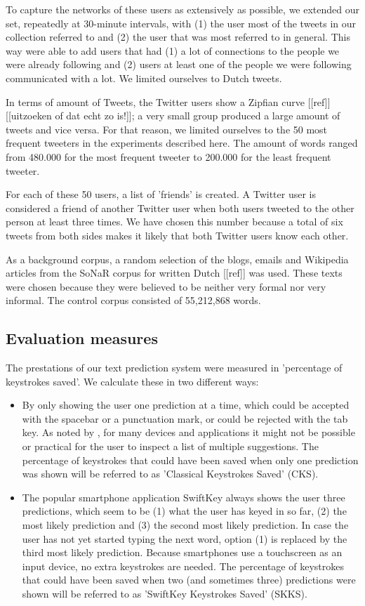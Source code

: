 \documentclass[11pt]{article}
\begin{document}
To capture the networks of these users as extensively as possible, we extended our set, repeatedly at 30-minute intervals, with (1) the user most of the tweets in our collection referred to and (2) the user that was most referred to in general. This way were able to add users that had (1) a lot of connections to the people we were already following and (2) users at least one of the people we were following communicated with a lot. We limited ourselves to Dutch tweets.

In terms of amount of Tweets, the Twitter users show a Zipfian curve [[ref]]  [[uitzoeken of dat echt zo is!]]; a very small group produced a large amount of tweets and vice versa. For that reason, we limited ourselves to the 50 most frequent tweeters in the experiments described here. The amount of words ranged from 480.000 for the most frequent tweeter to 200.000 for the least frequent tweeter.

For each of these 50 users, a list of 'friends' is created. A Twitter user is considered a friend of another Twitter user when both users tweeted to the other person at least three times. We have chosen this number because a total of six tweets from both sides makes it likely that both Twitter users know each other. 

As a background corpus, a random selection of the blogs, emails and Wikipedia articles from the SoNaR corpus for written Dutch [[ref]] was used. These texts were chosen because they were believed to be neither very formal nor very informal. The control corpus consisted of 55,212,868 words.

\subsection{Evaluation measures}
The prestations of our text prediction system were measured in 'percentage of keystrokes saved'. We calculate these in two different ways:
\begin{itemize}
\item By only showing the user one prediction at a time, which could be accepted with the spacebar or a punctuation mark, or could be rejected with the tab key. As noted by , for many devices and applications it might not be possible or practical for the user to inspect a list of multiple suggestions. The percentage of keystrokes that could have been saved when only one prediction was shown will be referred to as 'Classical Keystrokes Saved' (CKS).
\item The popular smartphone application SwiftKey always shows the user three predictions, which seem to be (1) what the user has keyed in so far, (2) the most likely prediction and (3) the second most likely prediction. In case the user has not yet started typing the next word, option (1) is replaced by the third most likely prediction. Because smartphones use a touchscreen as an input device, no extra keystrokes are needed. The percentage of keystrokes that could have been saved when two (and sometimes three) predictions were shown will be referred to as 'SwiftKey Keystrokes Saved' (SKKS).
\end{itemize}
\end{document}
